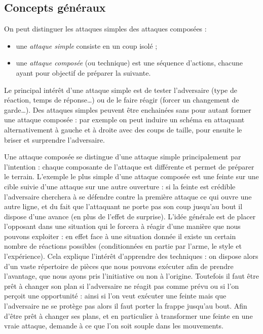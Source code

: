 \subsection{Concepts généraux}
\label{sec:att-def:attaque:concepts}


\begin{definition}

\noindent
On peut distinguer les attaques simples des attaques composées :
\begin{itemize}
	\item une \emph{attaque simple} consiste en un coup isolé ;
	\item une \emph{attaque composée} (ou technique) est une séquence d'actions, chacune ayant pour objectif de préparer la suivante.
\end{itemize}
\end{definition}


Le principal intérêt d'une attaque simple est de tester l'adversaire (type de réaction, temps de réponse…) ou de le faire réagir (forcer un changement de garde…).
Des attaques simples peuvent être enchainées sans pour autant former une attaque composée : par exemple on peut induire un schéma en attaquant alternativement à gauche et à droite avec des coups de taille, pour ensuite le briser et surprendre l'adversaire.

Une attaque composée se distingue d'une attaque simple principalement par l'intention : chaque composante de l'attaque est différente et permet de préparer le terrain.
L'exemple le plus simple d'une attaque composée est une feinte sur une cible suivie d'une attaque sur une autre ouverture : si la feinte est crédible l'adversaire cherchera à se défendre contre la première attaque ce qui ouvre une autre ligne, et du fait que l'attaquant ne porte pas son coup jusqu'au bout il dispose d'une avance (en plus de l'effet de surprise).
L'idée générale est de placer l'opposant dans une situation qui le forcera à réagir d'une manière que nous pouvons exploiter : en effet face à une situation donnée il existe un certain nombre de réactions possibles (conditionnées en partie par l'arme, le style et l'expérience).
Cela explique l'intérêt d'apprendre des techniques : on dispose alors d'un vaste répertoire de pièces que nous pouvons exécuter afin de prendre l'avantage, que nous ayons pris l'initiative ou non à l'origine.
Toutefois il faut être prêt à changer son plan si l'adversaire ne réagit pas comme prévu ou si l'on perçoit une opportunité : ainsi si l'on veut exécuter une feinte mais que l'adversaire ne se protège pas alors il faut porter la frappe jusqu'au bout.
Afin d'être prêt à changer ses plans, et en particulier à transformer une feinte en une vraie attaque, demande à ce que l'on soit souple dans les mouvements.

